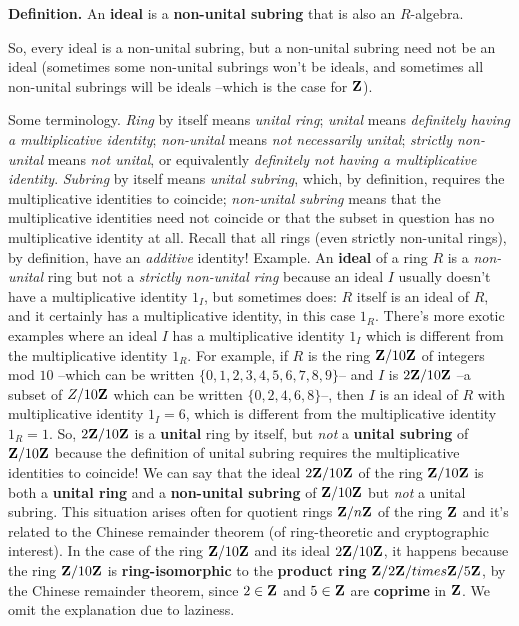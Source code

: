{\bf Definition.} An {\bf ideal} is a {\bf non-unital subring} that is also an $R$-algebra.

So, every ideal is a non-unital subring, but a non-unital subring need not be an ideal (sometimes some non-unital subrings won't be ideals, and sometimes all non-unital subrings will be ideals --which is the case for ${ \bf Z }$).

\vskip8pt
Some terminology. {\it Ring} by itself means {\it unital ring}; {\it unital} means {\it definitely having a multiplicative identity}; {\it non-unital} means {\it not necessarily unital}; {\it strictly non-unital} means {\it not unital}, or equivalently {\it definitely not having a multiplicative identity}. {\it Subring} by itself means {\it unital subring}, which, by definition, requires the multiplicative identities to coincide; {\it non-unital subring} means that the multiplicative identities need not coincide or that the subset in question has no multiplicative identity at all. Recall that all rings (even strictly non-unital rings), by definition, have an {\it additive} identity! Example. An {\bf ideal} of a ring $R$ is a {\it non-unital} ring but not a {\it strictly non-unital ring} because an ideal $I$ usually doesn't have a multiplicative identity $1_I$, but sometimes does: $R$ itself is an ideal of $R$, and it certainly has a multiplicative identity, in this case $1_R$. There's more exotic examples where an ideal $I$ has a multiplicative identity $1_I$ which is different from the multiplicative identity $1_R$. For example, if $R$ is the ring ${ \bf Z } / 10{ \bf Z }$ of integers mod $10$ --which can be written $\{0, 1, 2, 3, 4, 5, 6, 7, 8, 9\}$-- and $I$ is $2{ \bf Z } / 10{ \bf Z }$ --a subset of $Z / 10{ \bf Z }$ which can be written $\{0, 2, 4, 6, 8\}$--, then $I$ is an ideal of $R$ with multiplicative identity $1_I = 6$, which is different from the multiplicative identity $1_R = 1$. So, $2{ \bf Z } / 10{ \bf Z }$ is a {\bf unital} ring by itself, but {\it not} a {\bf unital subring} of ${ \bf Z } / 10{ \bf Z }$ because the definition of unital subring requires the multiplicative identities to coincide! We can say that the ideal $2{ \bf Z } / 10{ \bf Z }$ of the ring ${ \bf Z } / 10{ \bf Z }$ is both a {\bf unital ring} and a {\bf non-unital subring} of ${ \bf Z } / 10{ \bf Z }$ but {\it not} a unital subring. This situation arises often for quotient rings ${ \bf Z } / n{ \bf Z }$ of the ring ${ \bf Z }$ and it's related to the Chinese remainder theorem (of ring-theoretic and cryptographic interest). In the case of the ring ${ \bf Z } / 10{ \bf Z }$ and its ideal $2{ \bf Z } / 10{ \bf Z }$, it happens because the ring ${ \bf Z } / 10{ \bf Z }$ is {\bf ring-isomorphic} to the {\bf product ring} ${ \bf Z } / 2{ \bf Z } /times { \bf Z } / 5{ \bf Z }$, by the Chinese remainder theorem, since $2 \in {  \bf Z }$ and $5 \in {  \bf Z }$ are {\bf coprime} in ${ \bf Z }$. We omit the explanation due to laziness.

